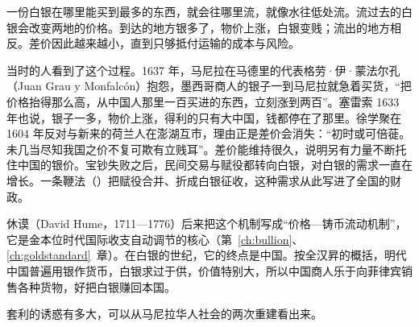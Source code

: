 \begin{intuition}[白银往最值钱的地方流]
一份白银在哪里能买到最多的东西，就会往哪里流，就像水往低处流。流过去的白银会改变两地的价格。到达的地方银多了，物价上涨，白银变贱；流出的地方相反。差价因此越来越小，直到只够抵付运输的成本与风险。

当时的人看到了这个过程。1637 年，马尼拉在马德里的代表格劳·伊·蒙法尔孔（Juan Grau y Monfalcón）抱怨，墨西哥商人的银子一到马尼拉就急着买货，“把价格抬得那么高，从中国人那里一百买进的东西，立刻涨到两百”\cite{br}。塞雷索 1633 年也说，银子一多，物价上涨，得利的只有大中国，钱都停在了那里\cite{br}。徐学聚在 1604 年反对与新来的荷兰人在澎湖互市，理由正是差价会消失：“初时或可倍蓰。未几当尽知我国之价不复可欺有立贱耳”\cite{huangmingjingshiwenbian}。差价能维持很久，说明另有力量不断托住中国的银价。宝钞失败之后，民间交易与赋役都转向白银，对白银的需求一直在增长。一条鞭法（）把赋役合并、折成白银征收，这种需求从此写进了全国的财政。
\end{intuition}

休谟（David Hume，1711—1776）后来把这个机制写成“价格—铸币流动机制”，它是金本位时代国际收支自动调节的核心（第~\ref{ch:bullion}、\ref{ch:goldstandard}~章）。在白银的世纪，它的终点是中国。按全汉昇的概括，明代中国普遍用银作货币，白银求过于供，价值特别大，所以中国商人乐于向菲律宾销售各种货物，好把白银赚回本国\cite{quan1969}。

套利的诱惑有多大，可以从马尼拉华人社会的两次重建看出来。

